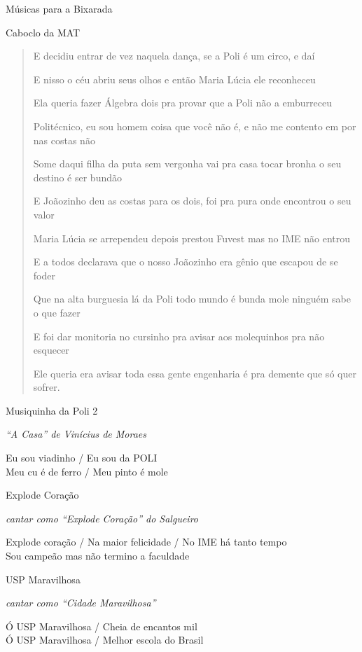 \begin{secao}{Músicas para a Bixarada}
\begin{subsecao}{Caboclo da MAT}
\begin{verse}
E decidiu entrar de vez naquela dança, se a Poli é um circo, e daí

E nisso o céu abriu seus olhos e então Maria Lúcia ele reconheceu

Ela queria fazer Álgebra dois pra provar que a Poli não a emburreceu

Politécnico, eu sou homem coisa que você não é, e não me contento em por nas
costas não

Some daqui filha da puta sem vergonha vai pra casa tocar bronha o seu destino é
ser bundão

E Joãozinho deu as costas para os dois, foi pra pura onde encontrou o seu valor

Maria Lúcia se arrependeu depois prestou Fuvest mas no IME não entrou

E a todos declarava que o nosso Joãozinho era gênio que escapou de se foder

Que na alta burguesia lá da Poli todo mundo é bunda mole ninguém sabe o que
fazer

E foi dar monitoria no cursinho pra avisar aos molequinhos pra não esquecer

Ele queria era avisar toda essa gente engenharia é pra demente que só quer
sofrer.
\end{verse}
\end{subsecao}

\begin{subsecao}{Musiquinha da Poli 2}

{\em ``A Casa'' de Vinícius de Moraes}

Eu sou viadinho / Eu sou da POLI \\
Meu cu é de ferro / Meu pinto é mole
\end{subsecao}

\begin{subsecao}{Explode Coração}

{\em cantar como ``Explode Coração'' do Salgueiro}

Explode coração / Na maior felicidade / No IME há tanto tempo \\
Sou campeão mas não termino a faculdade
\end{subsecao}

\begin{subsecao}{USP Maravilhosa}

{\em cantar como ``Cidade Maravilhosa''}

Ó USP Maravilhosa / Cheia de encantos mil \\
Ó USP Maravilhosa / Melhor escola do Brasil


\end{subsecao}
\end{secao}
